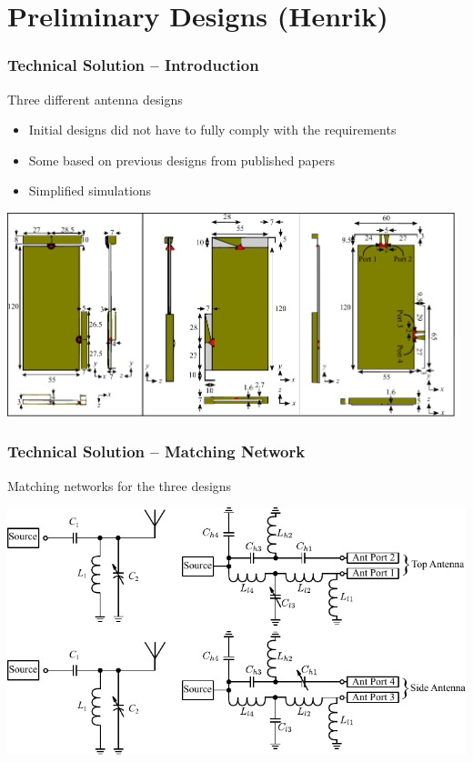 \section[Preliminary Designs]{Preliminary Designs (Henrik)}
\begin{frame}
    \frametitle{Technical Solution -- Introduction}
    \begin{block}{Three different antenna designs}
      \begin{itemize}
      \item Initial designs did not have to fully comply with the requirements
      \item Some based on previous designs from published papers
      \item Simplified simulations
      \end{itemize}
    \end{block}
\vspace*{-0.5cm}
  \begin{center} 
    \includegraphics[width=0.98\textwidth]{img/henrik/all_td}%

  \end{center}
\end{frame}

\begin{frame}
    \frametitle{Technical Solution -- Matching Network}
    \begin{block}{Matching networks for the three designs}
  \begin{center} 
    \includegraphics[width=\textwidth]{img/henrik/schematic_tuning}%
  \end{center}
\end{block}
\end{frame}



